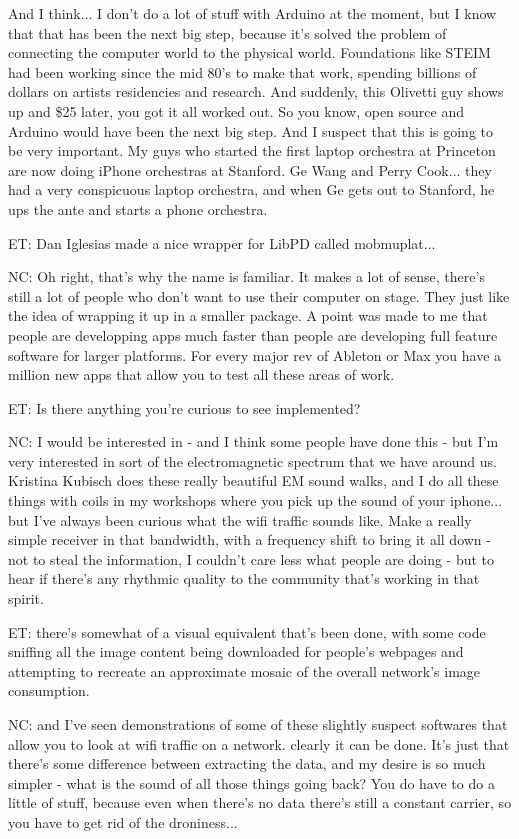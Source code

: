 And I think... I don't do a lot of stuff with Arduino at the moment, but I know that that has been the next big step, because it's solved the problem of connecting the computer world to the physical world. Foundations like STEIM had been working since the mid 80's to make that work, spending billions of dollars on artists residencies and research. And suddenly, this Olivetti guy shows up and \$25 later, you got it all worked out. So you know, open source and Arduino would have been the next big step. And I suspect that this is going to be very important. My guys who started the first laptop orchestra at Princeton are now doing iPhone orchestras at Stanford. Ge Wang and Perry Cook... they had a very conspicuous laptop orchestra, and when Ge gets out to Stanford, he ups the ante and starts a phone orchestra. 

ET: Dan Iglesias made a nice wrapper for LibPD called mobmuplat...

NC: Oh right, that's why the name is familiar. It makes a lot of sense, there's still a lot of people who don't want to use their computer on stage. They just like the idea of wrapping it up in a smaller package. A point was made to me that people are developping apps much faster than people are developing full feature software for larger platforms. For every major rev of Ableton or Max you have a million new apps that allow you to test all these areas of work.

ET: Is there anything you're curious to see implemented? 

NC: I would be interested in - and I think some people have done this - but I'm very interested in sort of the electromagnetic spectrum that we have around us. Kristina Kubisch does these really beautiful EM sound walks, and I do all these things with coils in my workshops where you pick up the sound of your iphone... but I've always been curious what the wifi traffic sounds like. Make a really simple receiver in that bandwidth, with a frequency shift to bring it all down - not to steal the information, I couldn't care less what people are doing - but to hear if there's any rhythmic quality to the community that's working in that spirit. 

ET: there's somewhat of a visual equivalent that's been done, with some code sniffing all the image content being downloaded for people's webpages and attempting to recreate an approximate mosaic of the overall network's image consumption. 

NC: and I've seen demonstrations of some of these slightly suspect softwares that allow you to look at wifi traffic on a network. clearly it can be done. It's just that there's some difference between extracting the data, and my desire is so much simpler - what is the sound of all those things going back? You do have to do a little of stuff, because even when there's no data there's still a constant carrier, so you have to get rid of the droniness... 

